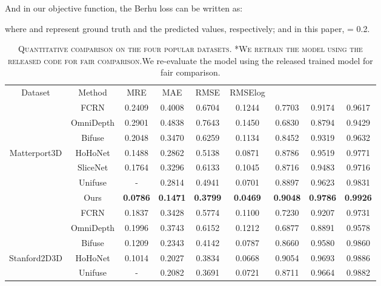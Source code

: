 \documentclass[10pt,times,mathptm,psfig,twocolumn,journals]{IEEEtran}
\begin{document}
And in our objective function, the Berhu loss can be written as:
\begin{small}

\end{small}
where  and  represent ground truth and the predicted values, respectively; and in this paper,  = 0.2.
\begin{table*}[t]
\begin{center}
\caption{\textsc{Quantitative comparison on the four popular datasets. *We retrain the model using the released code for fair comparison.}We re-evaluate the model using the released trained model for fair comparison. }
\label{table:c1}
\begin{tabular}{ccccccccc}
\hline\noalign{\smallskip}
Dataset&Method & MRE & MAE & RMSE & RMSElog &  &  & \\
\noalign{\smallskip}
\hline
\hline
&FCRN\cite{laina2016deeper}       & 0.2409  & 0.4008 & 0.6704 & 0.1244 & 0.7703 &0.9174 &0.9617     \\
&OmniDepth\cite{zioulis2018omnidepth} & 0.2901  & 0.4838 & 0.7643 & 0.1450 & 0.6830 & 0.8794 & 0.9429      \\
&Bifuse\cite{2020BiFuse}    & 0.2048  & 0.3470 & 0.6259 & 0.1134 &0.8452 & 0.9319 & 0.9632     \\
Matterport3D&HoHoNet\cite{sun2021hohonet}   & 0.1488  & 0.2862 & 0.5138 & 0.0871 & 0.8786 & 0.9519 & 0.9771    \\
&SliceNet\cite{Pintore_2021_CVPR}   & 0.1764  & 0.3296 & 0.6133 & 0.1045 & 0.8716 & 0.9483 & 0.9716    \\
&Unifuse\cite{Jiang_2021} & -  & 0.2814 & 0.4941 & 0.0701 & 0.8897 & 0.9623 & 0.9831\\
&Ours   & \textbf{0.0786}  & \textbf{0.1471} & \textbf{0.3799} & \textbf{0.0469} & \textbf{0.9048} & \textbf{0.9786} & \textbf{0.9926}    \\
\hline
\noalign{\smallskip}
\hline
&FCRN\cite{laina2016deeper}       & 0.1837  & 0.3428 & 0.5774 & 0.1100 & 0.7230 &0.9207 &0.9731     \\
&OmniDepth\cite{zioulis2018omnidepth} & 0.1996  & 0.3743 & 0.6152 & 0.1212 & 0.6877 & 0.8891 & 0.9578      \\
&Bifuse\cite{2020BiFuse}    & 0.1209  & 0.2343 & 0.4142 & 0.0787 &0.8660 & 0.9580 & 0.9860     \\
Stanford2D3D&HoHoNet\cite{sun2021hohonet}   & 0.1014  & 0.2027 & 0.3834 & 0.0668 & 0.9054 & 0.9693 & 0.9886    \\
&Unifuse\cite{Jiang_2021} & -  & 0.2082 & 0.3691 & 0.0721 & 0.8711 & 0.9664 & 0.9882\\

\end{tabular}
\end{center}
\end{table*}
\end{document}
